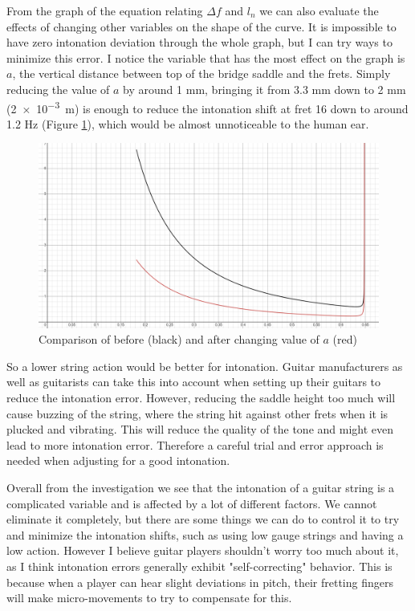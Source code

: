 \documentclass[11pt]{article}
\begin{document}
\begin{flushleft}
        From the graph of the equation relating $\Delta f$ and $l_n$ we can also evaluate the effects of changing other variables on the shape of the curve. It is impossible to have zero intonation deviation through the whole graph, but I can try ways to minimize this error. I notice the variable that has the most effect on the graph is $a$, the vertical distance between top of the bridge saddle and the frets. Simply reducing the value of $a$ by around 1 mm, bringing it from 3.3 mm down to 2 mm (\SI{2e-3}{m}) is enough to reduce the intonation shift at fret 16 down to around 1.2 Hz (Figure \ref{fig12}), which would be almost unnoticeable to the human ear. \par
        \begin{figure}[!h]
            \includegraphics[width = \textwidth]{compare_graph_a.png}
            \caption{Comparison of before (black) and after changing value of $a$ (red)} \label{fig12}
        \end{figure}
        \FloatBarrier
        So a lower string action would be better for intonation. Guitar manufacturers as well as guitarists can take this into account when setting up their guitars to reduce the intonation error. However, reducing the saddle height too much will cause buzzing of the string, where the string hit against other frets when it is plucked and vibrating. This will reduce the quality of the tone and might even lead to more intonation error. Therefore a careful trial and error approach is needed when adjusting for a good intonation. \par
        
        Overall from the investigation we see that the intonation of a guitar string is a complicated variable and is affected by a lot of different factors. We cannot eliminate it completely, but there are some things we can do to control it to try and minimize the intonation shifts, such as using low gauge strings and having a low action. However I believe guitar players shouldn't worry too much about it, as I think intonation errors generally exhibit "self-correcting" behavior. This is because when a player can hear slight deviations in pitch, their fretting fingers will make micro-movements to try to compensate for this.
    

\end{flushleft}
\end{document}
